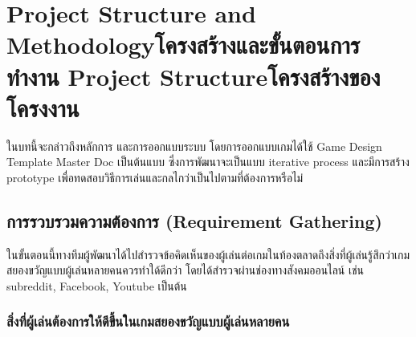 \chapter{\ifproject%
\ifenglish Project Structure and Methodology\else โครงสร้างและขั้นตอนการทำงาน\fi
\else%
\ifenglish Project Structure\else โครงสร้างของโครงงาน\fi
\fi
}

ในบทนี้จะกล่าวถึงหลักการ และการออกแบบระบบ โดยการออกแบบเกมได้ใช้ Game Design Template Master Doc \cite{GDD1, GDD2} เป็นต้นแบบ ซึ่งการพัฒนาจะเป็นแบบ iterative process และมีการสร้าง prototype เพื่อทดสอบวิธีการเล่นและกลไกว่าเป็นไปตามที่ต้องการหรือไม่

\makeatletter


\makeatother

\section{การรวบรวมความต้องการ (Requirement Gathering)}

ในขั้นตอนนี้ทางทีมผู้พัฒนาได้ไปสำรวจข้อคิดเห็นของผู้เล่นต่อเกมในท้องตลาดถึงสิ่งที่ผู้เล่นรู้สึกว่าเกมสยองขวัญแบบผู้เล่นหลายคนควรทำใด้ดีกว่า โดยได้สำรวจผ่านช่องทางสังคมออนไลน์ เช่น subreddit, Facebook, Youtube เป็นต้น

\subsection{สิ่งที่ผู้เล่นต้องการให้ดีขึ้นในเกมสยองขวัญแบบผู้เล่นหลายคน}

